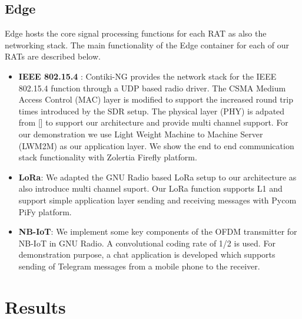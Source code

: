\documentclass[10pt,emptycopyrightspace]{ewsn-proc}
\begin{document}
\subsection{Edge}
Edge hosts the core signal processing functions for each RAT as also the networking stack. The main functionality of the Edge container for each of our RATs are described below.
\begin{itemize}
	\item \textbf{IEEE 802.15.4} : Contiki-NG provides the network stack for the IEEE 802.15.4 function through a UDP based radio driver. The CSMA Medium Access Control (MAC) layer is modified to support the increased round trip times introduced by the SDR setup. The physical layer (PHY) is adpated from [] to support our architecture and provide multi channel support. For our demonstration we use Light Weight Machine to Machine Server (LWM2M) as our application layer. We show the end to end communication stack functionality with Zolertia Firefly platform.
		
	\item \textbf{LoRa}: We adapted the GNU Radio based LoRa setup to our architecture as also introduce multi channel suport. Our LoRa function supports L1 and support simple application layer sending and receiving messages with Pycom PiFy platform.
	

	\item \textbf{NB-IoT}: We implement some key components of the OFDM transmitter for NB-IoT in GNU Radio. A convolutional coding rate of 1/2 is used. For demonstration purpose, a chat application is developed which supports sending of Telegram messages from a mobile phone to the receiver.
\end{itemize}

\section{Results}

%
%
\balance

\end{document}
